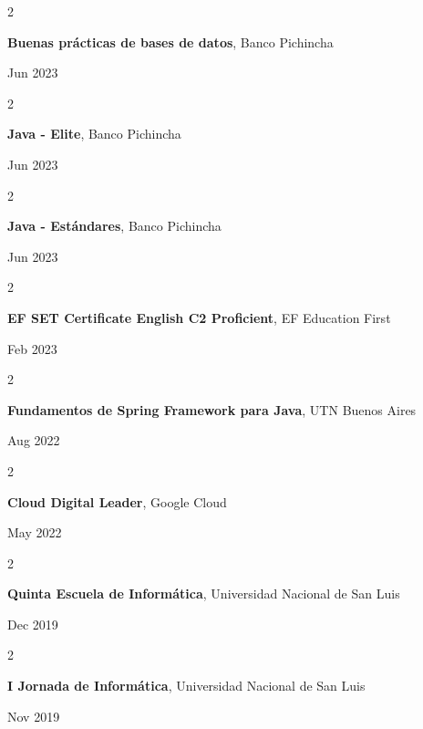 \documentclass[10pt, letterpaper]{article}
\newenvironment{twocolentry}[2][]{
    \onecolentry
    \def\secondColumn{#2}
    \setcolumnwidth{\fill, 4.5 cm}
    \begin{paracol}{2}
}{
    \switchcolumn \raggedleft \secondColumn
    \end{paracol}
    \endonecolentry
} %
\begin{document}
    \begin{twocolentry}{
            Jun 2023
        }
        \textbf{Buenas prácticas de bases de datos}, Banco Pichincha
    \end{twocolentry}
    \begin{twocolentry}{
            Jun 2023
        }
        \textbf{Java - Elite}, Banco Pichincha
    \end{twocolentry}
    \begin{twocolentry}{
            Jun 2023
        }
        \textbf{Java - Estándares}, Banco Pichincha
    \end{twocolentry}
    \begin{twocolentry}{
            Feb 2023
        }
        \textbf{EF SET Certificate English C2 Proficient}, EF Education First
    \end{twocolentry}
    \begin{twocolentry}{
            Aug 2022
        }
        \textbf{Fundamentos de Spring Framework para Java}, UTN Buenos Aires
    \end{twocolentry}
    \begin{twocolentry}{
            May 2022
        }
        \textbf{Cloud Digital Leader}, Google Cloud
    \end{twocolentry}
    \begin{twocolentry}{
            Dec 2019
        }
        \textbf{Quinta Escuela de Informática}, Universidad Nacional de San Luis
    \end{twocolentry}
    \begin{twocolentry}{
            Nov 2019
        }
        \textbf{I Jornada de Informática}, Universidad Nacional de San Luis
    \end{twocolentry}
\end{document}
